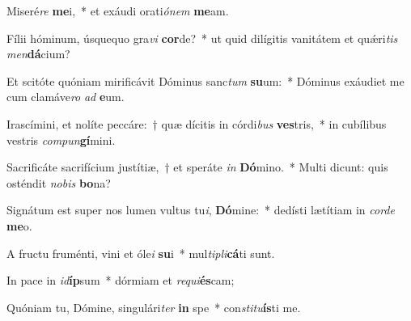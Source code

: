 \item Miseré\textit{re} \textbf{me}i,~* et exáudi orati\textit{ó}\textit{nem} \textbf{me}am.
\item Fílii hóminum, úsquequo gra\textit{vi} \textbf{cor}de?~* ut quid dilígitis vanitátem et quǽri\textit{tis} \textit{men}\textbf{dá}cium?
\item Et scitóte quóniam mirificávit Dóminus sanc\textit{tum} \textbf{su}um:~* Dóminus exáudiet me cum clamáve\textit{ro} \textit{ad} \textbf{e}um.
\item Irascímini, et nolíte peccáre:~† quæ dícitis in córdi\textit{bus} \textbf{ves}tris,~* in cubílibus vestris \textit{com}\textit{pun}\textbf{gí}mini.
\item Sacrificáte sacrifícium justítiæ,~† et speráte \textit{in} \textbf{Dó}mino.~* Multi dicunt: quis osténdit \textit{no}\textit{bis} \textbf{bo}na?
\item Signátum est super nos lumen vultus tu\textit{i}, \textbf{Dó}mine:~* dedísti lætítiam in \textit{cor}\textit{de} \textbf{me}o.
\item A fructu fruménti, vini et óle\textit{i} \textbf{su}i~* mul\textit{ti}\textit{pli}\textbf{cá}ti sunt.
\item In pace in \textit{id}\textbf{íp}sum~* dórmiam et \textit{re}\textit{qui}\textbf{és}cam;
\item Quóniam tu, Dómine, singulári\textit{ter} \textbf{in} spe~* con\textit{sti}\textit{tu}\textbf{ís}ti me.

